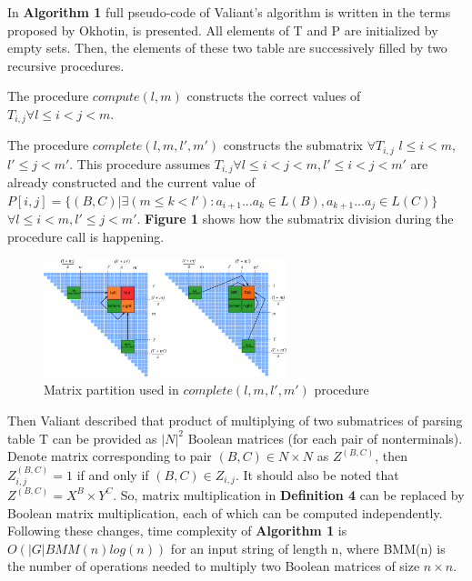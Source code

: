 In \textbf{Algorithm 1} full pseudo-code of Valiant's algorithm is written in the terms proposed by Okhotin, is presented. All elements of T and P are initialized by empty sets. Then, the elements of these two table are successively filled by two recursive procedures.

The procedure $compute(l, m)$ constructs the correct values of $T_{i,j} \forall l \le i < j < m$.

The procedure $complete(l, m, l', m')$ constructs the submatrix $\forall T_{i, j}$ $l \le i < m$, $l' \le j < m'$. This procedure assumes $T_{i, j} \forall l \leq i < j < m,  l' \leq i < j < m'$ are already constructed and the current value of  $P[i, j] =  \{ (B, C) |\exists (m \le k < l'): a_{i + 1}...a_{k} \in L(B), a_{k + 1}...a_{j} \in L(C)\}$ $\forall l \leq i < m,  l' \leq j < m'$. \textbf{Figure 1} shows how the submatrix division during the procedure call is happening.

\begin{figure}[h]
\centering
\includegraphics[width=200pt]{splitting.pdf}
\centering
\caption{Matrix partition used in $complete(l, m, l', m')$ procedure} \label{fig1}
\end{figure}

Then Valiant described that product of multiplying of two submatrices of parsing table T can be provided as $|N|^2$ Boolean matrices (for each pair of nonterminals). Denote matrix corresponding to pair $(B, C) \in N \times N$ as $Z^{(B, C)}$, then $Z_{i, j}^{(B, C)} = 1$ if and only if $(B, C) \in Z_{i, j}$. It should also be noted that $Z^{(B, C)} = X^{B} \times Y^{C}$. So, matrix multiplication in \textbf{Definition 4} can be replaced by Boolean matrix multiplication, each of which can be computed independently. Following these changes, time complexity of \textbf{Algorithm 1} is $O(|G|BMM(n)log(n))$ for an input string of length n, where BMM(n) is the number of operations needed to multiply two Boolean matrices of size $n \times n$.
